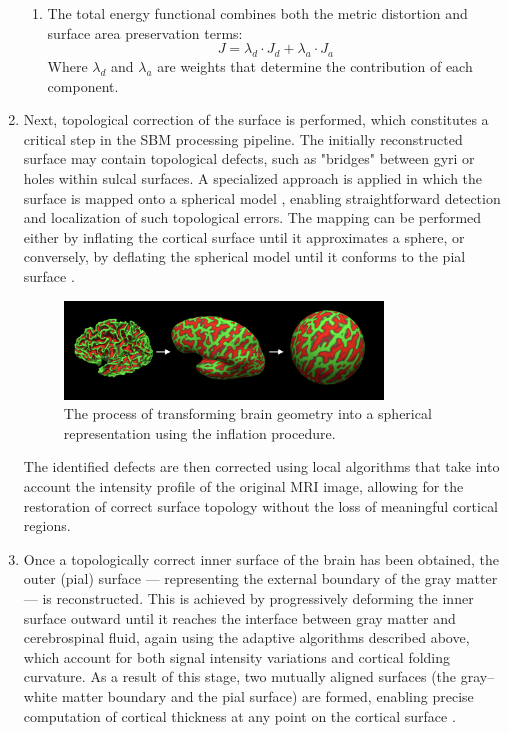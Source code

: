 \documentclass[default]{subfiles}
\begin{document}
\begin{enumerate}
\begin{enumerate}
        \item The total energy functional combines both the metric distortion and surface area preservation terms:
        $$J = \lambda_d \cdot J_d + \lambda_a \cdot J_a$$
        Where $\lambda_d$ and $\lambda_a$ are weights that determine the contribution of each component.
    \end{enumerate}

    \item Next, topological correction of the surface is performed, which constitutes a critical step in the SBM
    processing pipeline. The initially reconstructed surface may contain topological defects, such as "bridges"
    between gyri or holes within sulcal surfaces. A specialized approach is applied in which the surface is mapped onto
    a spherical model \cite{fischl_1999}, enabling straightforward detection and localization of such topological
    errors. The mapping can be performed either by inflating the cortical surface until it approximates a sphere, or
    conversely, by deflating the spherical model until it conforms to the pial surface \cite{fischl_2001, dale_1999}.

    \begin{figure}[H]
        \centering
        \includegraphics[width=0.8\textwidth]{image/pic2.png}
        \caption{
          The process of transforming brain geometry into a spherical representation using the inflation procedure.
        }
    \end{figure}

    The identified defects are then corrected using local algorithms that take into account the intensity profile of
    the original MRI image, allowing for the restoration of correct surface topology without the loss of meaningful
    cortical regions.

    \item Once a topologically correct inner surface of the brain has been obtained, the outer (pial) surface —
    representing the external boundary of the gray matter — is reconstructed. This is achieved by progressively
    deforming the inner surface outward until it reaches the interface between gray matter and cerebrospinal fluid,
    again using the adaptive algorithms described above, which account for both signal intensity variations and
    cortical folding curvature. As a result of this stage, two mutually aligned surfaces (the gray–white matter
    boundary and the pial surface) are formed, enabling precise computation of cortical thickness at any point on the
    cortical surface \cite{fischl_2008, fischl_2004}.


\end{enumerate}
\end{document}
